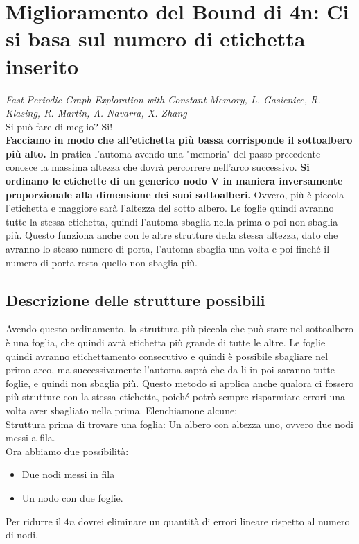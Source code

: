 \section{Miglioramento del Bound di 4n: Ci si basa sul numero di etichetta inserito}

\emph{Fast Periodic Graph Exploration
    with Constant Memory, L. Gasieniec, R. Klasing, R. Martin, A. Navarra, X.
    Zhang}\\

Si può fare di meglio? Si!\\ \textbf{Facciamo in modo che all'etichetta più
    bassa corrisponde il sottoalbero più alto.} In pratica l'automa avendo una
"memoria" del passo precedente conosce la massima altezza che dovrà percorrere
nell'arco successivo. \textbf{Si ordinano le etichette di un generico nodo V in
    maniera inversamente proporzionale alla dimensione dei suoi sottoalberi.}
Ovvero, più è piccola l'etichetta e maggiore sarà l'altezza del sotto albero. Le
foglie quindi avranno tutte la stessa etichetta, quindi l'automa sbaglia nella
prima o poi non sbaglia più. Questo funziona anche con le altre strutture della
stessa altezza, dato che avranno lo stesso numero di porta, l'automa sbaglia una
volta e poi finché il numero di porta resta quello non sbaglia più.

\subsection{Descrizione delle strutture possibili}
Avendo questo ordinamento, la struttura più piccola che può stare nel
sottoalbero è una foglia, che quindi avrà etichetta più grande di tutte le
altre. Le foglie quindi avranno etichettamento consecutivo e quindi è possibile
sbagliare nel primo arco, ma successivamente l'automa saprà che da li in poi
saranno tutte foglie, e quindi non sbaglia più. Questo metodo si applica anche
qualora ci fossero più strutture con la stessa etichetta, poiché potrò sempre
risparmiare errori una volta aver sbagliato nella prima. Elenchiamone alcune:\\
Struttura prima di trovare una foglia: Un albero con altezza uno, ovvero due
nodi messi a fila.\\
Ora abbiamo due possibilità:
\begin{itemize}
    \item Due nodi messi in fila
    \item Un nodo con due foglie.
\end{itemize}
Per ridurre il $4n$ dovrei eliminare un quantità di errori lineare rispetto al
numero di nodi.
